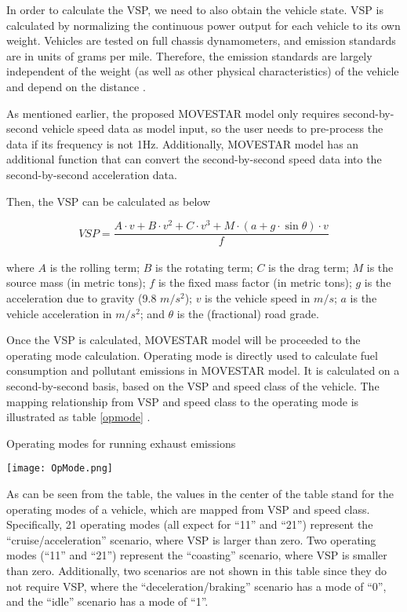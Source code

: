 \documentclass{article}
\begin{document}
	In order to calculate the VSP, we need to also obtain the vehicle state. VSP is calculated by normalizing the continuous power output for each vehicle to its own weight. Vehicles are tested on full chassis dynamometers, and emission standards are in units of grams per mile. Therefore, the emission standards are largely independent of the weight (as well as other physical characteristics) of the vehicle and depend on the distance \cite{exhaust2017}.
	
	As mentioned earlier, the proposed MOVESTAR model only requires second-by-second vehicle speed data as model input, so the user needs to pre-process the data if its frequency is not 1Hz. Additionally, MOVESTAR model has an additional function that can convert the second-by-second speed data into the second-by-second acceleration data.
	
	Then, the VSP can be calculated as below
	
    \begin{equation} \label{vsp}
    VSP = \frac {A \cdot v + B \cdot v^2 + C \cdot v^3 + M \cdot (a + g \cdot \sin{\theta}) \cdot v}{f}
    \end{equation}\\
    \noindent where $A$ is the rolling term; $B$ is the rotating term; $C$ is the drag term; $M$ is the source mass (in metric tons); $f$ is the fixed mass factor (in metric tons); $g$ is the acceleration due to gravity (9.8 $m/s^2$); $v$ is the vehicle speed in $m/s$; $a$ is the vehicle acceleration in $m/s^2$; and $\theta$ is the (fractional) road grade.
    
   
	Once the VSP is calculated, MOVESTAR model will be proceeded to the operating mode calculation. Operating mode is directly used to calculate fuel consumption and pollutant emissions in MOVESTAR model. It is calculated on a second-by-second basis, based on the VSP and speed class of the vehicle. The mapping relationship from VSP and speed class to the operating mode is illustrated as table \ref{opmode} \cite{moves2011workshop}. 
    
    \begin{table}[ht!]
        \centering
        \caption{Operating modes for running exhaust emissions}
        \texttt{[image: OpMode.png]}
        \label{opmode}
    \end{table}

    As can be seen from the table, the values in the center of the table stand for the operating modes of a vehicle, which are mapped from VSP and speed class. Specifically, 21 operating modes (all expect for ``11'' and ``21'') represent the ``cruise/acceleration'' scenario, where VSP is larger than zero. Two operating modes (``11'' and ``21'') represent the ``coasting'' scenario, where VSP is smaller than zero. Additionally, two scenarios are not shown in this table since they do not require VSP, where the ``deceleration/braking'' scenario has a mode of ``0'', and the ``idle'' scenario has a mode of ``1''.
    
\end{document}
